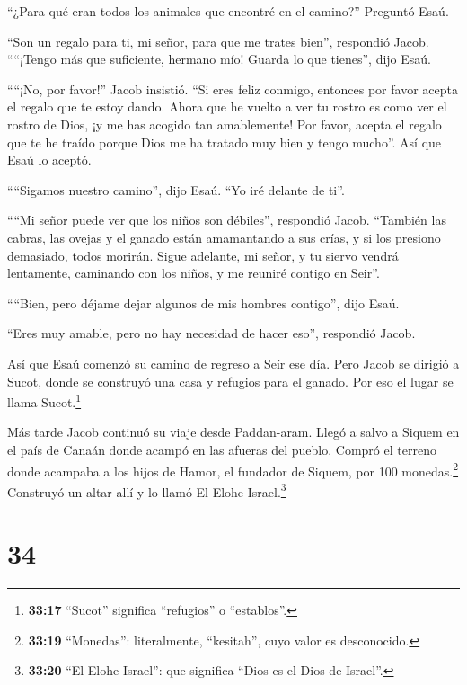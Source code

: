  ``¿Para qué eran todos los animales que encontré en el
camino?'' Preguntó Esaú.

``Son un regalo para ti, mi señor, para que me trates bien'', respondió
Jacob.  ````¡Tengo más que suficiente, hermano mío! Guarda
lo que tienes'', dijo Esaú.

 ````¡No, por favor!'' Jacob insistió. ``Si eres feliz
conmigo, entonces por favor acepta el regalo que te estoy dando. Ahora
que he vuelto a ver tu rostro es como ver el rostro de Dios, ¡y me has
acogido tan amablemente!  Por favor, acepta el regalo que
te he traído porque Dios me ha tratado muy bien y tengo mucho''. Así que
Esaú lo aceptó.

 ````Sigamos nuestro camino'', dijo Esaú. ``Yo iré delante
de ti''.

 ````Mi señor puede ver que los niños son débiles'',
respondió Jacob. ``También las cabras, las ovejas y el ganado están
amamantando a sus crías, y si los presiono demasiado, todos morirán.
 Sigue adelante, mi señor, y tu siervo vendrá lentamente,
caminando con los niños, y me reuniré contigo en Seir''.

 ````Bien, pero déjame dejar algunos de mis hombres
contigo'', dijo Esaú.

``Eres muy amable, pero no hay necesidad de hacer eso'', respondió
Jacob.

 Así que Esaú comenzó su camino de regreso a Seír ese día.
 Pero Jacob se dirigió a Sucot, donde se construyó una casa
y refugios para el ganado. Por eso el lugar se llama Sucot.\footnote{\textbf{33:17}
  ``Sucot'' significa ``refugios'' o ``establos''.}

 Más tarde Jacob continuó su viaje desde Paddan-aram. Llegó
a salvo a Siquem en el país de Canaán donde acampó en las afueras del
pueblo.  Compró el terreno donde acampaba a los hijos de
Hamor, el fundador de Siquem, por 100 monedas.\footnote{\textbf{33:19}
  ``Monedas'': literalmente, ``kesitah'', cuyo valor es desconocido.}
 Construyó un altar allí y lo llamó
El-Elohe-Israel.\footnote{\textbf{33:20} ``El-Elohe-Israel'': que
  significa ``Dios es el Dios de Israel''.}

\hypertarget{section-33}{%
\section{34}\label{section-33}}

